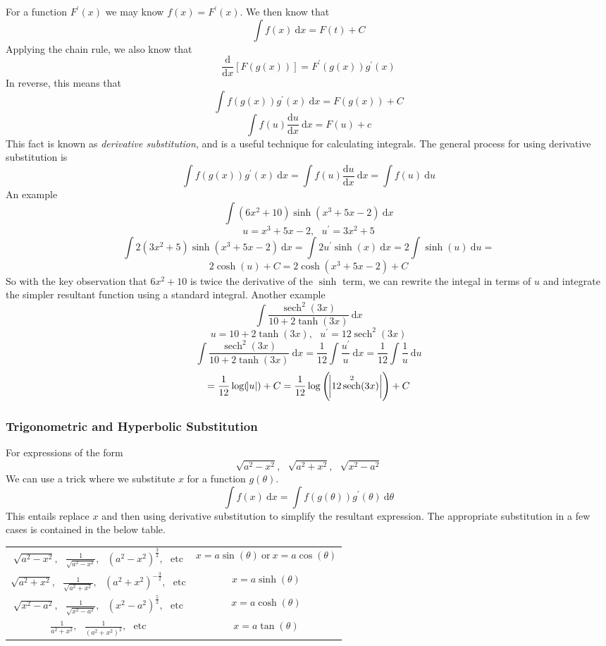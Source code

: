 \documentclass[12pt]{report}
\newcommand{\dx}{\:\mathrm{d}x}
\newcommand{\dd}[2]{\frac{\mathrm{d}#1}{\mathrm{d}#2}}
\newcommand{\mor}{\:\mathrm{or}\:}
\newcommand{\mcom}{, \:\:\:}
\newcommand{\derivx}[1]{\frac{\mathrm{d}}{\mathrm{d}x}\left[#1\right]}
\DeclareMathOperator{\sech}{sech}
\begin{document}
\begin{flushleft}
For a function \(F^\prime(x)\) we may know \(f(x) = F^\prime(x)\). We then know
that
\[\int f(x) \dx = F(t) + C\]
Applying the chain rule, we also know that
\[\derivx{F(g(x))} = F^\prime(g(x))g^\prime(x)\]
In reverse, this means that
\[\int f(g(x))g^\prime(x) \dx = F(g(x)) + C\]
\[\int f(u)\dd{u}{x}\dx = F(u) + c\]
This fact is known as \textit{derivative substitution}, and is a useful
technique for calculating integrals. The general process for using derivative
substitution is
\[\int f(g(x))g^\prime(x)\dx = \int f(u)\dd{u}{x}\dx 
= \int f(u) \:\mathrm{d}u\]
An example
\[\int (6x^2 + 10)\sinh(x^3 + 5x - 2)\dx\]
\[u = x^3 + 5x - 2\mcom u^\prime = 3x^2 + 5\]
\[\int 2(3x^2 + 5)\sinh(x^3 + 5x - 2)\dx = \int 2u^\prime\sinh(x)\dx
= 2\int\sinh(u) \:\mathrm{d}u = \]
\[2\cosh(u) + C = 2\cosh(x^3 + 5x - 2) + C\]
So with the key observation that \(6x^2 + 10\) is twice the derivative of the
\(\sinh\) term, we can rewrite the integal in terms of \(u\) and integrate the
simpler resultant function using a standard integral. Another example
\[\int\frac{\sech^2(3x)}{10 + 2\tanh(3x)}\dx\]
\[u = 10 + 2\tanh(3x)\mcom u^\prime = 12\sech^2(3x)\]
\[\int\frac{\sech^2(3x)}{10 + 2\tanh(3x)}\dx 
= \frac{1}{12}\int\frac{u^\prime}{u}\dx = \frac{1}{12}\int\frac{1}{u}
\:\mathrm{d}u\]
\[= \frac{1}{12}\log(\abs{u}) + C 
= \frac{1}{12}\log\left(\abs{12\sech^2(3x)}\right) + C\]

\subsubsection*{Trigonometric and Hyperbolic Substitution}

For expressions of the form
\[\sqrt{a^2 - x^2}\mcom \sqrt{a^2 + x^2}\mcom \sqrt{x^2 - a^2}\]
We can use a trick where we substitute \(x\) for a function \(g(\theta)\).
\[\int f(x)\dx = \int f(g(\theta))g^\prime(\theta) \:\mathrm{d}\theta\]
This entails replace \(x\) and then using derivative substitution to simplify
the resultant expression. The appropriate substitution in a few cases is
contained in the below table.

\renewcommand{\arraystretch}{2}
\begin{center}    
    \begin{tabular}{||c|c||}
        \(\sqrt{a^2 - x^2}\mcom \frac{1}{\sqrt{a^2 - x^2}},
        \:\:\: (a^2 - x^2)^\frac{3}{2}\mcom \mathrm{etc}\) &
        \(x = a\sin(\theta) \mor x = a\cos(\theta)\) \\
        \(\sqrt{a^2 + x^2}\mcom \frac{1}{\sqrt{a^2 + x^2}},
        \:\:\: (a^2 + x^2)^{-\frac{3}{2}}\mcom \mathrm{etc}\) &
        \(x = a\sinh(\theta)\) \\
        \(\sqrt{x^2 - a^2}\mcom \frac{1}{\sqrt{x^2 - a^2}},
        \:\:\: (x^2 - a^2)^\frac{5}{2}\mcom \mathrm{etc}\) &
        \(x = a\cosh(\theta)\) \\
        \(\frac{1}{a^2 + x^2}\mcom \frac{1}{(a^2 + x^2)^2}\mcom
        \mathrm{etc}\) &
        \(x = a\tan(\theta)\) \\
    \end{tabular}
\end{center}
\renewcommand{\arraystretch}{1}


\end{flushleft}
\end{document}
